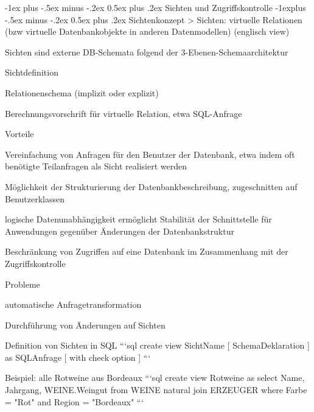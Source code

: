 \documentclass[a4paper]{article}
\makeatletter
\renewcommand{\section}{\@startsection{section}{1}{0mm}%
                                {-1ex plus -.5ex minus -.2ex}%
                                {0.5ex plus .2ex}%
                                {\normalfont\large\bfseries}}
\renewcommand{\subsection}{\@startsection{subsection}{2}{0mm}%
                                {-1explus -.5ex minus -.2ex}%
                                {0.5ex plus .2ex}%
                                {\normalfont\normalsize\bfseries}}
\makeatother
\begin{document}
\begin{multicols}{3}
\begin{itemize*}
        \section{Sichten und Zugriffskontrolle}
        \subsection{Sichtenkonzept}
        > Sichten: virtuelle Relationen (bzw virtuelle Datenbankobjekte in anderen Datenmodellen) (englisch view)
        \begin{itemize*}
            \item Sichten sind externe DB-Schemata folgend der 3-Ebenen-Schemaarchitektur
            \begin{itemize*}
                \item Sichtdefinition
                \item Relationenschema (implizit oder explizit)
                \item Berechnungsvorschrift für virtuelle Relation, etwa SQL-Anfrage
            \end{itemize*}
            \item Vorteile
            \begin{itemize*}
                \item Vereinfachung von Anfragen für den Benutzer der Datenbank, etwa indem oft benötigte Teilanfragen als Sicht realisiert werden
                \item Möglichkeit der Strukturierung der Datenbankbeschreibung, zugeschnitten auf Benutzerklassen
                \item logische Datenunabhängigkeit ermöglicht Stabilität der Schnittstelle für Anwendungen gegenüber Änderungen der Datenbankstruktur
                \item Beschränkung von Zugriffen auf eine Datenbank im Zusammenhang mit der Zugriffskontrolle
            \end{itemize*}
            \item Probleme
            \begin{itemize*}
                \item automatische Anfragetransformation
                \item Durchführung von Änderungen auf Sichten
            \end{itemize*}
            \item Definition von Sichten in SQL
            ```sql
            create view SichtName [ SchemaDeklaration ]
            as SQLAnfrage
                [ with check option ]
            ```
            \item Beispiel: alle Rotweine aus Bordeaux
            ```sql
            create view Rotweine as
            select Name, Jahrgang, WEINE.Weingut
            from WEINE natural join ERZEUGER
            where Farbe = "Rot" and Region = "Bordeaux"
            ```
        \end{itemize*}


\end{itemize*}
\end{multicols}
\end{document}
